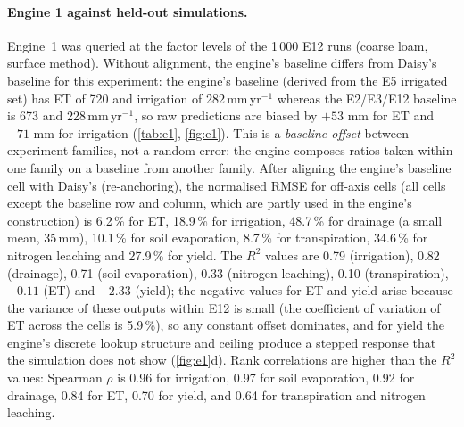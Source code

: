 \paragraph{Engine 1 against held-out simulations.}
\label{sec:e1}
Engine~1 was queried at the factor levels of the 1\,000 E12 runs (coarse loam, surface method). Without alignment, the engine's baseline differs from Daisy's baseline for this experiment: the engine's baseline (derived from the E5 irrigated set) has ET of 720 and irrigation of 282\,mm\,yr$^{-1}$ whereas the E2/E3/E12 baseline is 673 and 228\,mm\,yr$^{-1}$, so raw predictions are biased by $+53$ mm for ET and $+71$ mm for irrigation (\cref{tab:e1}, \cref{fig:e1}). This is a \emph{baseline offset} between experiment families, not a random error: the engine composes ratios taken within one family on a baseline from another family. After aligning the engine's baseline cell with Daisy's (re-anchoring), the normalised RMSE for off-axis cells (all cells except the baseline row and column, which are partly used in the engine's construction) is 6.2\,\% for ET, 18.9\,\% for irrigation, 48.7\,\% for drainage (a small mean, 35\,mm), 10.1\,\% for soil evaporation, 8.7\,\% for transpiration, 34.6\,\% for nitrogen leaching and 27.9\,\% for yield. The $R^2$ values are 0.79 (irrigation), 0.82 (drainage), 0.71 (soil evaporation), 0.33 (nitrogen leaching), 0.10 (transpiration), $-0.11$ (ET) and $-2.33$ (yield); the negative values for ET and yield arise because the variance of these outputs within E12 is small (the coefficient of variation of ET across the cells is 5.9\,\%), so any constant offset dominates, and for yield the engine's discrete lookup structure and ceiling produce a stepped response that the simulation does not show (\cref{fig:e1}d). Rank correlations are higher than the $R^2$ values: Spearman $\rho$ is 0.96 for irrigation, 0.97 for soil evaporation, 0.92 for drainage, 0.84 for ET, 0.70 for yield, and 0.64 for transpiration and nitrogen leaching.

